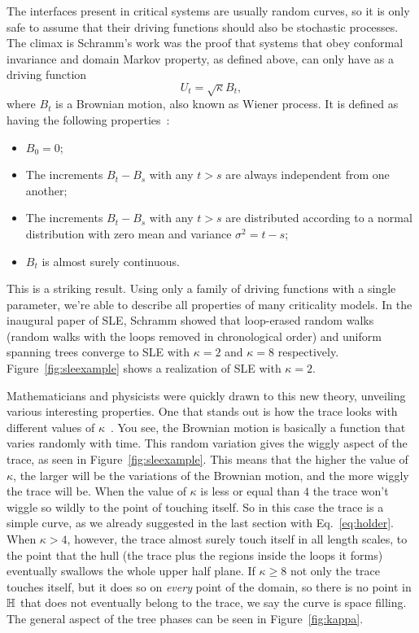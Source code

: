 The interfaces present in critical systems are usually random curves, so it is
only safe to assume that their driving functions should also be stochastic
processes. The climax is Schramm's work was the proof that systems that obey
conformal invariance and domain Markov property, as defined above, can only
have as a driving function
\begin{equation}
    U_{t}=\sqrt{\kappa}B_{t},
\end{equation}
where $B_t$ is a Brownian motion, also known as Wiener process.
It is defined as having the following properties~\cite{Durrett1996}:
\begin{itemize}
    \item $B_0=0$;
    \item The increments $B_t-B_s$ with any $t>s$ are always independent from
        one another;
    \item The increments $B_t-B_s$ with any $t>s$ are distributed according to
        a normal distribution with zero mean and variance $\sigma^2=t-s$;
    \item $B_t$ is almost surely continuous.
\end{itemize}
This is a striking result. Using only a family of driving functions with a
single parameter, we're able to describe all properties of many criticality
models. In the inaugural paper of SLE, Schramm showed that loop-erased random
walks (random walks with the loops removed in chronological order) and uniform
spanning trees converge to SLE with $\kappa=2$ and $\kappa=8$ respectively.
Figure~\ref{fig:sleexample} shows a realization of SLE with $\kappa=2$.

Mathematicians and physicists were quickly drawn to this new theory, unveiling
various interesting properties. One that stands out is how the trace looks with
different values of $\kappa$~\cite{Rohde2011}. You see, the Brownian motion is
basically a function that varies randomly with time. This random variation
gives the wiggly aspect of the trace, as seen in Figure~\ref{fig:sleexample}.
This means that the higher the value of $\kappa$, the larger will be the
variations of the Brownian motion, and the more wiggly the trace will be. When
the value of $\kappa$ is less or equal than $4$ the trace won't wiggle so
wildly to the point of touching itself. So in this case the trace is a simple
curve, as we already suggested in the last section with Eq.~\ref{eq:holder}.
When $\kappa>4$, however, the trace almost surely touch itself in all length
scales, to the point that the hull (the trace plus the regions inside the loops
it forms) eventually swallows the whole upper half plane. If $\kappa\geq8$ not
only the trace touches itself, but it does so on \textit{every} point of the
domain, so there is no point in $\mathbb{H}$ that does not eventually belong to the
trace, we say the curve is space filling. The general aspect of the tree phases
can be seen in Figure~\ref{fig:kappa}.

